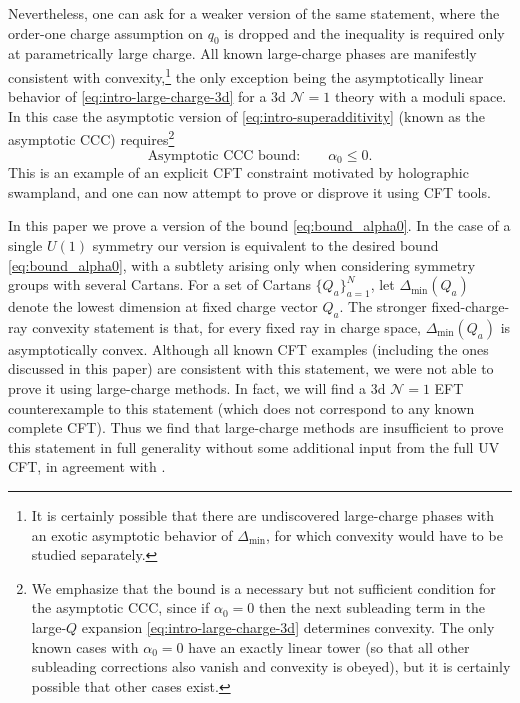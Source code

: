 \documentclass[a4paper,11pt]{article}
\newcommand\Dm{\Delta_{\min}}
\begin{document}
Nevertheless, one can ask for a weaker version of the same statement, where the order-one charge assumption on $q_0$ is dropped and the inequality is required only at parametrically large charge. All known large-charge phases are manifestly consistent with convexity,\footnote{It is certainly possible that there are undiscovered large-charge phases with an exotic asymptotic behavior of $\Dm$, for which convexity would have to be studied separately.} the only exception being the asymptotically linear behavior of \eqref{eq:intro-large-charge-3d} for a 3d $\mathcal{N}=1$ theory with a moduli space. In this case the asymptotic version of \eqref{eq:intro-superadditivity} (known as the asymptotic CCC) requires\footnote{We emphasize that the bound is a necessary but not sufficient condition for the asymptotic CCC, since if $\alpha_0=0$ then the next subleading term in the large-$Q$ expansion \eqref{eq:intro-large-charge-3d} determines convexity. The only known cases with $\alpha_0=0$ have an exactly linear tower (so that all other subleading corrections also vanish and convexity is obeyed), but it is certainly possible that other cases exist.}
\begin{equation}\label{eq:bound_alpha0}
  \text{Asymptotic CCC bound:}\qquad\alpha_0\leq0.
\end{equation}
This is an example of an explicit CFT constraint motivated by holographic swampland, and one can now attempt to prove or disprove it using CFT tools. 

In this paper we prove a version of the bound \eqref{eq:bound_alpha0}. In the case of a single $U(1)$ symmetry our version is equivalent to the desired bound \eqref{eq:bound_alpha0}, with a subtlety arising only when considering symmetry groups with several Cartans. For a set of Cartans $\{Q_a\}_{a=1}^N$, let $\Delta_{\min}(Q_a)$ denote the lowest dimension at fixed charge vector $Q_a$. The stronger fixed-charge-ray convexity statement is that, for every fixed ray in charge space, $\Delta_{\min}(Q_a)$ is asymptotically convex. Although all known CFT examples (including the ones discussed in this paper) are consistent with this statement, we were not able to prove it using large-charge methods. In fact, we will find a 3d $\mathcal{N}=1$ EFT counterexample to this statement (which does not correspond to any known complete CFT). Thus we find that large-charge methods are insufficient to prove this statement in full generality without some additional input from the full UV CFT, in agreement with \cite{Cohen:2025slc}.
\end{document}
